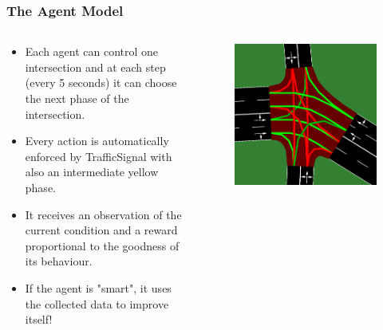 \documentclass{beamer}
\begin{document}
\begin{frame}
\frametitle{The Agent Model}
  \begin{columns}
    \begin{column}{0.6\textwidth}
    {\small
    \begin{itemize}
      \item Each agent can control one intersection and at each step (every 5 seconds) it can choose the next phase of the intersection.
      \item Every action is automatically enforced by TrafficSignal with also an intermediate yellow phase.
      \item It receives an observation of the current condition and a reward proportional to the goodness of its behaviour.
      \item If the agent is "smart", it uses the collected data to improve itself!
    \end{itemize}}
    \end{column}
    \begin{column}{0.4\textwidth}
      \begin{figure}
        \centering
        \includegraphics[width=1.0\textwidth]{figures/sumo-rf-agent.png}
      \end{figure}
    \end{column}
  \end{columns}
\end{frame}
\end{document}
